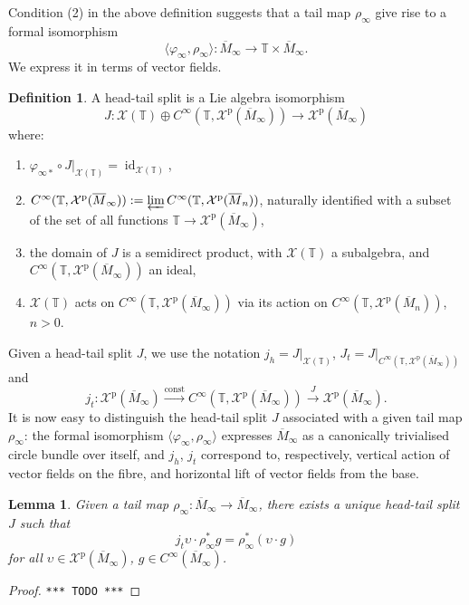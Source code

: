 \documentclass{article}
\def\MISS{\texttt{*** TODO ***}}
\def\TT{\mathbb{T}}
\def\XX{\mathcal{X}}
\DeclareMathOperator{\id}{\mathrm{id}}
\def\p{\mathrm{p}}
\newtheorem{lem}{Lemma}
\theoremstyle{definition}
\newtheorem{defn}{Definition}
\begin{document}
Condition (2) in the above definition suggests that
a tail map $\rho_\infty$ give rise to a formal isomorphism
$$\langle \varphi_\infty,\rho_\infty\rangle : \overline M_\infty \to \TT\times\overline M_\infty.$$
We express it in terms of vector fields.
\begin{defn}
        A head-tail split is a Lie algebra isomorphism
$$
J : \XX(\TT) \oplus C^\infty(\TT, \XX^\p(\overline M_\infty)) \to \XX^\p(\overline M_\infty)
$$
where:
\begin{enumerate}
        \item $\varphi_{\infty*}\circ J|_{\XX(\TT)} = \id_{\XX(\TT)}$,
        \item $C^\infty(\TT,\XX^\p(\overline M_\infty)):=\varprojlim C^\infty(\TT,\XX^\p(\overline M_n))$, naturally identified with a subset of the set of all functions $\TT \to \XX^\p(\overline M_\infty)$,
        \item the domain of $J$ is a semidirect product, with  $\XX(\TT)$ a subalgebra, and $C^\infty(\TT,\XX^\p(\overline M_\infty))$ an ideal,
        \item $\XX(\TT)$ acts on $C^\infty(\TT, \XX^\p(\overline M_\infty))$
                via its action on $C^\infty(\TT,\XX^\p(\overline M_n))$,  $n>0$.
\end{enumerate}
\end{defn}
Given a head-tail split $J$, we use the notation $ j_h=J|_{\XX(\TT)}$,
$J_t = J|_{C^\infty(\TT,\XX^\p(\overline M_\infty))}$
and $$ j_t : \XX^\p(\overline M_\infty)\xrightarrow{\mathrm{const}}C^\infty(\TT,\XX^\p(\overline M_\infty))
\xrightarrow{J} \XX^\p(\overline M_\infty).$$
It is now easy to distinguish the head-tail split $J$
associated with a given tail map $\rho_\infty$:
the formal isomorphism $\langle \varphi_\infty,\rho_\infty\rangle$
expresses $\overline M_\infty$
as a canonically trivialised circle bundle over itself,
and $j_h$, $j_t$
correspond to, respectively, vertical action of vector fields on the fibre, and
horizontal lift of vector fields from the base.
\begin{lem}\label{lem:hts}
        Given a tail map $\rho_\infty : \overline M_\infty \to \overline M_\infty$,
        there exists a unique head-tail split $J$
        such that $$ j_t \upsilon \cdot \rho_\infty^* g = \rho_\infty^* (\upsilon \cdot g)$$
        for all $\upsilon \in \XX^\p(\overline M_\infty)$, $g \in C^\infty(\overline M_\infty)$.
\end{lem}
\begin{proof}\MISS{}\end{proof}
\end{document}
